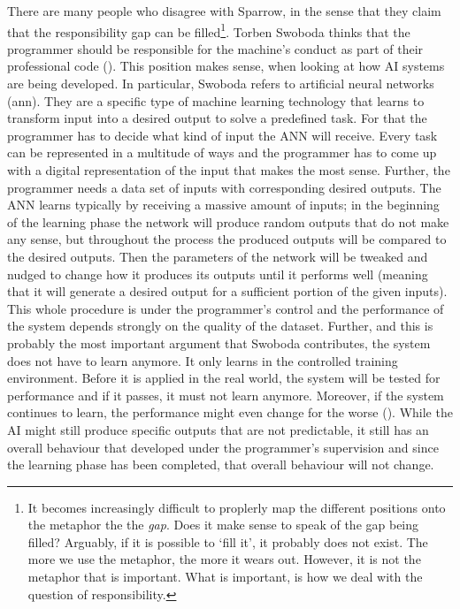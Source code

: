 \documentclass{article}
\begin{document}
There are many people who disagree with Sparrow, in the sense that they claim
that the responsibility gap can be filled\footnote{It becomes increasingly
	difficult to proplerly map the different positions onto the metaphor the
	the \textit{gap}. Does it make sense to speak of the gap being filled?
	Arguably, if it is possible to `fill it', it probably does not exist.
	The more we use the metaphor, the more it wears out. However, it is not
	the metaphor that is important. What is important, is how we deal with
	the question of responsibility.}.
Torben Swoboda thinks that the programmer should be responsible for the
machine's conduct as part of their professional code
(\cite{swoboda2017autonomous}). This position makes sense, when looking at how
AI systems are being developed. In particular, Swoboda refers to artificial
neural networks (\acrshort{ann}). They are a specific type of machine learning
technology that learns to transform input into a desired output to solve a
predefined task. For that the programmer has to decide what kind of input the ANN
will receive. Every task can be represented in a multitude of ways and the
programmer has to come up with a digital representation of the input that makes
the most sense. Further, the programmer needs a data set of inputs with
corresponding desired outputs. The ANN learns typically by receiving a massive
amount of inputs; in the beginning of the learning phase the network will
produce random outputs that do not make any sense, but throughout the process
the produced outputs will be compared to the desired outputs. Then the
parameters of the network will be tweaked and nudged to change how it produces
its outputs until it performs well (meaning that it will generate a desired
output for a sufficient portion of the given inputs). This whole procedure is
under the programmer's control and the performance of the system depends
strongly on the quality of the dataset. Further, and this is probably the most
important argument that Swoboda contributes, the system does not have to learn
anymore. It only learns in the controlled training environment. Before it is
applied in the real world, the system will be tested for performance and if it
passes, it must not learn anymore. Moreover, if the system continues to learn,
the performance might even change for the worse (\cite[p.
307-309]{swoboda2017autonomous}). While the AI might still produce specific
outputs that are not predictable, it still has an overall behaviour that
developed under the programmer's supervision and since the learning phase has
been completed, that overall behaviour will not change. 
\end{document}
